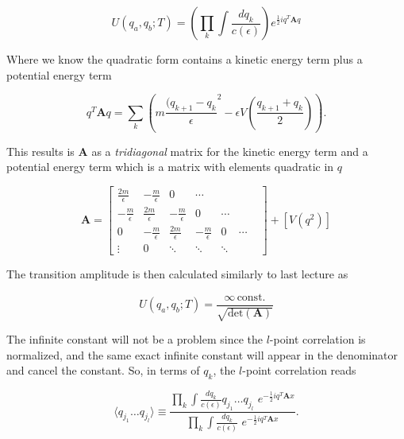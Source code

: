 \begin{equation}
U(q_a, q_b; T) = \left( \prod_k \int \frac{dq_k}{c(\epsilon)} \right) e^{\frac{1}{2} i q^T \textbf{A} q}
\end{equation}

\noindent Where we know the quadratic form contains a kinetic energy term plus a potential energy term

\begin{equation}
q^T \textbf{A} q = \sum_k \left( m \frac{(q_{k+1} - q_k}{\epsilon}^2 - \epsilon V (\frac{q_{k+1} + q_k}{2}) \right).
\end{equation}

\noindent This results is $\textbf{A}$ as a \textit{tridiagonal} matrix for the kinetic energy term and a potential energy term which is a matrix with elements quadratic in $q$

\begin{equation}
\textbf{A} = 
\begin{bmatrix}
    \frac{2m}{\epsilon} & -\frac{m}{\epsilon} & 0 & \cdots & & & \\
    -\frac{m}{\epsilon} & \frac{2m}{\epsilon} & -\frac{m}{\epsilon} & 0 & \cdots & & \\
    0 & -\frac{m}{\epsilon} & \frac{2m}{\epsilon}& -\frac{m}{\epsilon}& 0 & \cdots \\
    \vdots & 0 &\ddots & \ddots & \ddots
\end{bmatrix}
+ [V( q^2 )]
\end{equation}

\noindent The transition amplitude is then calculated similarly to last lecture as

\begin{equation}
U(q_a, q_b; T) = \frac{ \infty \, \text{const.}}{\sqrt{\text{det}(\textbf{A})}}
\end{equation}

\noindent The infinite constant will not be a problem since the $l$-point correlation is normalized, and the same exact infinite constant will appear in the denominator and cancel the constant. So, in terms of $q_k$, the $l$-point correlation reads

\begin{equation}
\langle q_{j_1} \dots q_{j_l} \rangle \equiv \frac{\prod_k \int \frac{dq_k}{c(\epsilon)} q_{j_1} \dots q_{j_l} \,\, e^{-\frac{1}{2} i q^T \textbf{A} x}}{\prod_k \int \frac{dq_k}{c(\epsilon)} \,\, e^{-\frac{1}{2} i q^T \textbf{A} x}}.
\end{equation}

